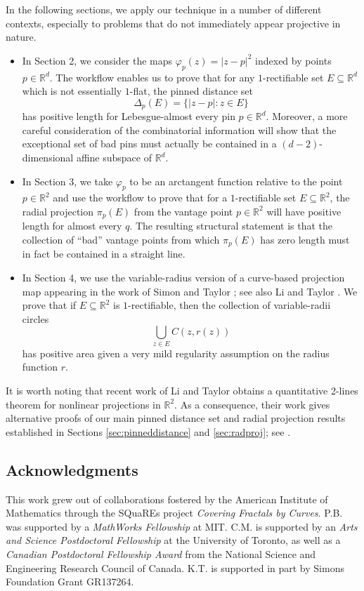 \documentclass[12pt]{amsart}
\theoremstyle{definition}
\numberwithin{equation}{section}
\newcommand{\R}{\mathbb{R}}
\begin{document}
 In the following sections, we apply our technique in a number of different contexts, especially to problems that do not immediately appear projective in nature.

\begin{itemize}
\item In Section 2, we consider the maps $\varphi_{p}(z) = |z - p|^2$ indexed by points $p \in \mathbb{R}^d$. The workflow enables us to prove that for any $1$-rectifiable set $E \subseteq \mathbb{R}^d$ which is not essentially $1$-flat, the pinned distance set
$$\Delta_p(E) = \{|z - p| : z \in E\}$$
has positive length for Lebesgue-almost every pin $p \in \mathbb{R}^d$. Moreover, a more careful consideration of the combinatorial information will show that the exceptional set of bad pins must actually be contained in a $(d-2)$-dimensional affine subspace of $\mathbb{R}^d$. 
\item In Section 3, we take $\varphi_{p}$ to be an arctangent function relative to the point $p \in \mathbb{R}^2$ and use the workflow to prove that for a $1$-rectifiable set $E \subseteq \mathbb{R}^2$, the radial projection $\pi_{p}(E)$ from the vantage point $p \in \mathbb{R}^2$ will have positive length for almost every $q$. The resulting structural statement is that the collection of ``bad'' vantage points from which $\pi_p(E)$ has zero length must in fact be contained in a straight line. 
\item In Section 4, we use the variable-radius version of a curve-based projection map appearing in the work of Simon and Taylor \cite{ST2022}; see also Li and Taylor \cite{LT2026}. We prove that if $E \subseteq \mathbb{R}^2$ is $1$-rectifiable, then the collection of variable-radii circles
$$\bigcup_{z \in E} C(z, r(z))$$
has positive area given a very mild regularity assumption on the radius function $r$.
\end{itemize}
\noindent It is worth noting that recent work of Li and Taylor obtains a quantitative 2-lines theorem for nonlinear projections in $\R^2$. As a consequence, their work gives alternative proofs of our main pinned distance set and radial projection results established in Sections \ref{sec:pinneddistance} and \ref{sec:radproj}; see \cite[Corollary 2.8 and Theorem 2.10]{LT2026}.

\subsection{Acknowledgments}
This work grew out of collaborations fostered by the American Institute of Mathematics through the SQuaREs project \textit{Covering Fractals by Curves}. P.B. was supported by a \textit{MathWorks Fellowship} at MIT. C.M. is supported by an \textit{Arts and Science Postdoctoral Fellowship} at the University of Toronto, as well as a \textit{Canadian Postdoctoral Fellowship Award} from the National Science and Engineering Research Council of Canada. K.T. is supported in part by Simons Foundation Grant GR137264.
\end{document}
